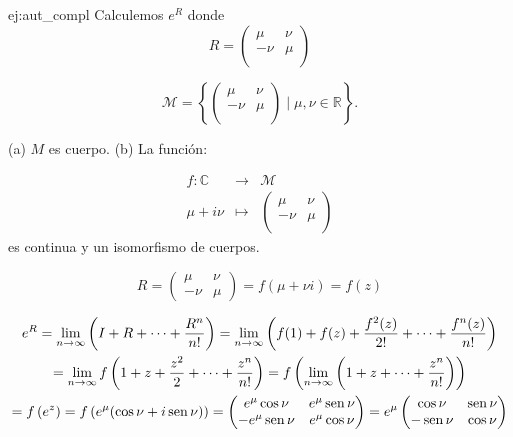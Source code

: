 \begin{ejemplo}{ej:aut_compl} Calculemos $e^{R}$ donde
$$
R=\begin{pmatrix}
     \mu & \nu \\ -\nu & \mu\\
    \end{pmatrix}
$$

\begin{definicion}{}
\[
 \mathcal{M}=\left\{
        \begin{pmatrix}
     \mu & \nu \\ -\nu & \mu\\
    \end{pmatrix}
    \mid
    \mu, \nu \in \mathbb{R}
    \right\}.
\]
\end{definicion}

\begin{ejercicio}{} (a) $M$ es  cuerpo. (b) La función:

\begin{eqnarray*}
 f:  \mathbb{C}&\to &\mathcal{M}\\
    \mu+i\nu & \mapsto 
    &\begin{pmatrix}
            \mu & \nu \\ -\nu & \mu\\
    \end{pmatrix}
 \end{eqnarray*}
es continua y un isomorfismo de cuerpos.


 \end{ejercicio}
$$
R=\begin{pmatrix}
\mu & \nu \\
-\nu & \mu
\end{pmatrix}=f(\mu+\nu i)=f(z)
$$


 
 
 \begin{multline}\label{eq:exp_compl}
    e^{R}   =\lim _{n \rightarrow \infty}\left(I+R+\cdots+\frac{R^{n}}{n!}\right)
           =\lim _{n \rightarrow \infty}\left(f(1)+f(z)+\frac{f^{2}(z)}{2!}+\cdots+\frac{f^n(z)}{n!}\right)\\
           =\lim _{n \rightarrow \infty} f\left(1+z+\frac{z^{2}}{2}+\cdots+\frac{z^{n}}{n !}\right)
           =f\left(\lim _{n \rightarrow \infty}\left(1+z+\cdots+\frac{z^{n}}{n!}\right)\right)\\
           =f\left(e^{z}\right)=f\left(e^{\mu}(\cos \nu+i \operatorname{sen} \nu)\right)
     =
        \begin{pmatrix}
            e^{\mu} \cos \nu & e^{\mu } \operatorname{sen} \nu \\
            -e^{\mu} \operatorname{sen}\nu & e^{\mu} \cos \nu
        \end{pmatrix}
         =e^{\mu}
        \begin{pmatrix}
            \cos \nu & \operatorname{sen} \nu \\
            -\operatorname{sen} \nu & \cos \nu
        \end{pmatrix}
 \end{multline}

\end{ejemplo}


